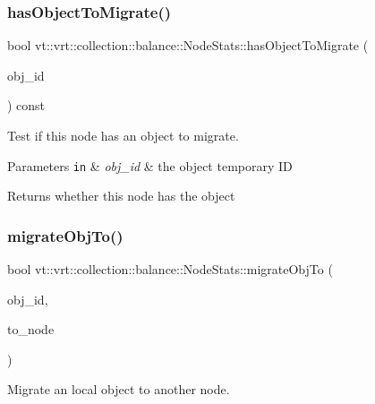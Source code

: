 \subsubsection{\texorpdfstring{has\+Object\+To\+Migrate()}{hasObjectToMigrate()}}
{\footnotesize\ttfamily bool vt\+::vrt\+::collection\+::balance\+::\+Node\+Stats\+::has\+Object\+To\+Migrate (\begin{DoxyParamCaption}\item[{\hyperlink{namespacevt_1_1vrt_1_1collection_1_1balance_a14c8d2c972f2913aa3f1636e5be0a120}{Element\+I\+D\+Type}}]{obj\+\_\+id }\end{DoxyParamCaption}) const}



Test if this node has an object to migrate. 


\begin{DoxyParams}[1]{Parameters}
\mbox{\tt in}  & {\em obj\+\_\+id} & the object temporary ID\\
\hline
\end{DoxyParams}
\begin{DoxyReturn}{Returns}
whether this node has the object 
\end{DoxyReturn}
\mbox{\label{structvt_1_1vrt_1_1collection_1_1balance_1_1_node_stats_a4beddbda7ae149a3470eba3a2fe80db5}} 
\subsubsection{\texorpdfstring{migrate\+Obj\+To()}{migrateObjTo()}}
{\footnotesize\ttfamily bool vt\+::vrt\+::collection\+::balance\+::\+Node\+Stats\+::migrate\+Obj\+To (\begin{DoxyParamCaption}\item[{\hyperlink{namespacevt_1_1vrt_1_1collection_1_1balance_a14c8d2c972f2913aa3f1636e5be0a120}{Element\+I\+D\+Type}}]{obj\+\_\+id,  }\item[{\hyperlink{namespacevt_a866da9d0efc19c0a1ce79e9e492f47e2}{Node\+Type}}]{to\+\_\+node }\end{DoxyParamCaption})}



Migrate an local object to another node. 


